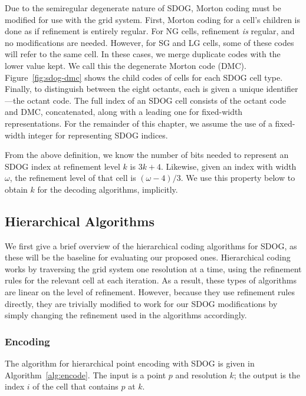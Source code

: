 Due to the semiregular degenerate nature of SDOG, Morton coding must be modified for use with the grid system.
First, Morton coding for a cell's children is done as if refinement is entirely regular.
For NG cells, refinement \textit{is} regular, and no modifications are needed.
However, for SG and LG cells, some of these codes will refer to the same cell.
In these cases, we merge duplicate codes with the lower value kept.
We call this the degenerate Morton code (DMC).
Figure~\ref{fig:sdog-dmc} shows the child codes of cells for each SDOG cell type.
Finally, to distinguish between the eight octants, each is given a unique identifier---the octant code.
The full index of an SDOG cell consists of the octant code and DMC, concatenated, along with a leading one for fixed-width representations.
For the remainder of this chapter, we assume the use of a fixed-width integer for representing SDOG indices.


From the above definition, we know the number of bits needed to represent an SDOG index at refinement level $k$ is $3k + 4$.
Likewise, given an index with width $\omega$, the refinement level of that cell is $(\omega - 4) / 3$.
We use this property below to obtain $k$ for the decoding algorithms, implicitly.


\subsection{Hierarchical Algorithms}
We first give a brief overview of the hierarchical coding algorithms for SDOG, as these will be the baseline for evaluating our proposed ones.
Hierarchical coding works by traversing the grid system one resolution at a time, using the refinement rules for the relevant cell at each iteration.
As a result, these types of algorithms are linear on the level of refinement.
However, because they use refinement rules directly, they are trivially modified to work for our SDOG modifications by simply changing the refinement used in the algorithms accordingly.


\subsubsection{Encoding}
The algorithm for hierarchical point encoding with SDOG is given in Algorithm~\ref{alg:encode}.
The input is a point $p$ and resolution $k$; the output is the index $i$ of the cell that contains $p$ at $k$.


